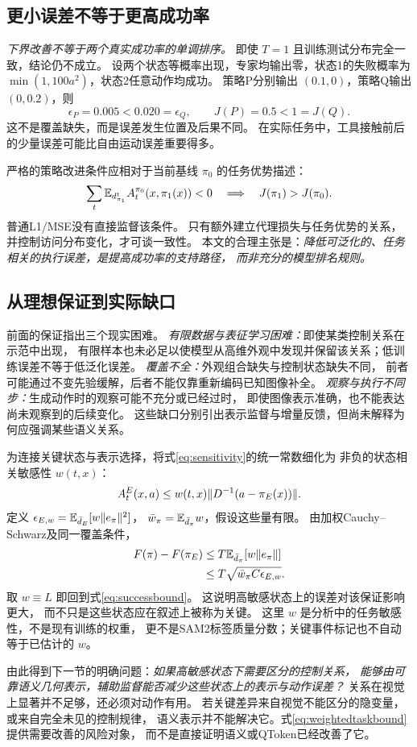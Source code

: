 \subsection{更小误差不等于更高成功率}
\emph{下界改善不等于两个真实成功率的单调排序。}
即使 $T=1$ 且训练测试分布完全一致，结论仍不成立。
设两个状态等概率出现，专家均输出零，状态1的失败概率为
$\min(1,100a^2)$，状态2任意动作均成功。
策略P分别输出 $(0.1,0)$，策略Q输出 $(0,0.2)$，则
\begin{equation}
 \epsilon_P=0.005<0.020=\epsilon_Q,\qquad
 J(P)=0.5<1=J(Q).
 \label{eq:counterexample}
\end{equation}
这不是覆盖缺失，而是误差发生位置及后果不同。
在实际任务中，工具接触前后的少量误差可能比自由运动误差重要得多。

严格的策略改进条件应相对于当前基线 $\pi_0$ 的任务优势描述：
\begin{equation}
 \sum_t\mathbb E_{d_{\pi_1}^t}A_t^{\pi_0}(x,\pi_1(x))<0
 \quad\Longrightarrow\quad J(\pi_1)>J(\pi_0).
 \label{eq:strict}
\end{equation}
普通L1/MSE没有直接监督该条件。
只有额外建立代理损失与任务优势的关系，并控制访问分布变化，才可谈一致性。
本文的合理主张是：\emph{降低可泛化的、任务相关的执行误差，是提高成功率的支持路径，
而非充分的模型排名规则。}

\subsection{从理想保证到实际缺口}
前面的保证指出三个现实困难。
\emph{有限数据与表征学习困难：}即使某类控制关系在示范中出现，
有限样本也未必足以使模型从高维外观中发现并保留该关系；低训练误差不等于低泛化误差。
\emph{覆盖不全：}外观组合缺失与控制状态缺失不同，
前者可能通过不变先验缓解，后者不能仅靠重新编码已知图像补全。
\emph{观察与执行不同步：}生成动作时的观察可能不充分或已经过时，
即使图像表示准确，也不能表达尚未观察到的后续变化。
这些缺口分别引出表示监督与增量反馈，但尚未解释为何应强调某些语义关系。

为连接关键状态与表示选择，将式\eqref{eq:sensitivity}的统一常数细化为
非负的状态相关敏感性 $w(t,x)$：
\begin{equation}
 A_t^E(x,a)\le w(t,x)\lVert D^{-1}(a-\pi_E(x))\rVert.
 \label{eq:statesensitivity}
\end{equation}
定义 $\epsilon_{E,w}=\mathbb E_{\bar d_E}[w\lVert e_\pi\rVert^2]$，
$\bar w_\pi=\mathbb E_{\bar d_\pi}w$，假设这些量有限。
由加权Cauchy--Schwarz及同一覆盖条件，
\begin{align}
 F(\pi)-F(\pi_E)
 &\le T\mathbb E_{\bar d_\pi}[w\lVert e_\pi\rVert]\nonumber\\
 &\le T\sqrt{\bar w_\pi C\epsilon_{E,w}}.
 \label{eq:weightedtaskbound}
\end{align}
取 $w\equiv L$ 即回到式\eqref{eq:successbound}。
这说明高敏感状态上的误差对该保证影响更大，
而不只是这些状态应在叙述上被称为关键。
这里 $w$ 是分析中的任务敏感性，不是现有训练的权重，
更不是SAM2标签质量分数；关键事件标记也不自动等于已估计的 $w$。

由此得到下一节的明确问题：\emph{如果高敏感状态下需要区分的控制关系，
能够由可靠语义几何表示，辅助监督能否减少这些状态上的表示与动作误差？}
关系在视觉上显著并不足够，还必须对动作有用。
若关键差异来自视觉不能区分的隐变量，或来自完全未见的控制规律，
语义表示并不能解决它。式\eqref{eq:weightedtaskbound}提供需要改善的风险对象，
而不是直接证明语义或QToken已经改善了它。
